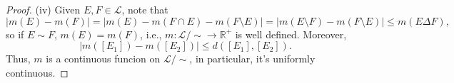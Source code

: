 \documentclass[a4paper]{article}
\begin{document}
\begin{proof}
(iv) Given $E, F \in \mathcal{L}$, note that$$
|m(E) - m(F)| = |m(E) - m(F \cap E) - m(F \setminus E)| = |m(E \setminus F) - m(F \setminus E)| \leq m(E \Delta F),
$$so if $E \sim  F$, $m(E) = m(F)$, i.e., $m: \mathcal{L} / \sim \to \mathbb{R}^+$ is well defined. Moreover,$$
|m([E_1]) - m([E_2])| \leq d([E_1], [E_2]).
$$Thus, $m$ is a continuous funcion on $\mathcal{L}/ \sim$, in particular, it's uniformly continuous.
\end{proof}
\end{document}
